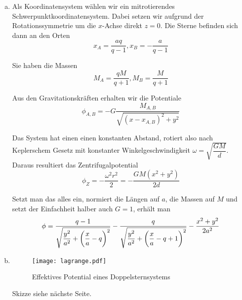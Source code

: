 \documentclass[a4paper,german,12pt,smallheadings]{scrartcl}
\begin{document}
\begin{enumerate}[a)]
  \item
    Als Koordinatensystem wählen wir ein mitrotierendes
    Schwerpunktkoordinatensystem. Dabei setzen wir aufgrund der
    Rotationssymmetrie um die $x$-Achse direkt $z=0$. Die Sterne befinden sich
    dann an den Orten
    \begin{equation}
      x_A = \frac{aq}{q-1}, x_B = -\frac{a}{q-1}
    \end{equation}

    Sie haben die Massen
    \begin{equation}
      M_A = \frac{qM}{q+1}, M_B = \frac{M}{q+1}
    \end{equation}

    Aus den Gravitationskräften erhalten wir die Potentiale
    \begin{equation}
      \phi_{A,B} = -G \frac{M_{A,B}}{\sqrt{(x - x_{A,B})^2 + y^2}}
    \end{equation}

    Das System hat einen einen konstanten Abstand, rotiert also nach
    Keplerschem Gesetz mit konstanter Winkelgeschwindigkeit $\omega = \sqrt{\dfrac{GM}{d}}$. Daraus
    resultiert das Zentrifugalpotential
    \begin{equation}
      \phi_Z = -\frac{\omega^2 r^2}{2} = -\frac{GM(x^2+y^2)}{2d}
    \end{equation}

    Setzt man das alles ein, normiert die Längen auf $a$, die Massen auf $M$
    und setzt der Einfachheit halber auch $G=1$, erhält man
    \begin{equation}
      \phi =
      \frac{q - 1}{\sqrt{\dfrac{y^2}{a^2} + \del{\dfrac{x}{a} - q}^2}}
      - \frac{q}{\sqrt{\dfrac{y^2}{a^2} + \del{\dfrac{x}{a} - q + 1}^2}}
      - \frac{x^2 + y^2}{2a^2}
    \end{equation}



  \item
    \begin{figure}[h!]
      \texttt{[image: lagrange.pdf]}
      \label{fig:pot}
      \caption{Effektives Potential eines Doppelsternsystems}
    \end{figure}
    Skizze siehe nächste Seite.


\end{enumerate}
\end{document}
